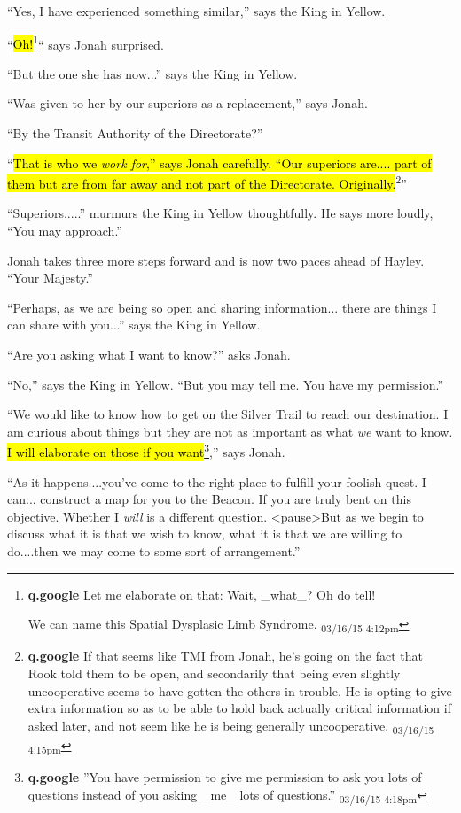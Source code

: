 ``Yes, I have experienced something similar,'' says the King in Yellow.

``\hl{Oh!}\footnote{\textbf{q.google }Let me elaborate on that: Wait, \_what\_?  Oh do tell!

We can name this Spatial Dysplasic Limb Syndrome. \textsubscript{03/16/15 4:12pm}}`` says Jonah surprised.

``But the one she has now...'' says the King in Yellow.

``Was given to her by our superiors as a replacement,'' says Jonah.

``By the Transit Authority of the Directorate?'' 

``\hl{That is who we \textit{work for},'' says Jonah carefully.  ``Our superiors are.... part of them but are from far away and not part of the Directorate.  Originally.}\footnote{\textbf{q.google }If that seems like TMI from Jonah, he's going on the fact that Rook told them to be open, and secondarily that being even slightly uncooperative seems to have gotten the others in trouble.  He is opting to give extra information so as to be able to hold back actually critical information if asked later, and not seem like he is being generally uncooperative. \textsubscript{03/16/15 4:15pm}}''

``Superiors.....'' murmurs the King in Yellow thoughtfully.  He says more loudly, ``You may approach.'' 

Jonah takes three more steps forward and is now two paces ahead of Hayley.  ``Your Majesty.''

``Perhaps, as we are being so open and sharing information... there are things I can share with you...'' says the King in Yellow.

``Are you asking what I want to know?'' asks Jonah.

``No,'' says the King in Yellow.  ``But you may tell me.  You have my permission.''

``We would like to know how to get on the Silver Trail to reach our destination.  I am curious about things but they are not as important as what \textit{we} want to know.   \hl{I will elaborate on those if you want}\footnote{\textbf{q.google }''You have permission to give me permission to ask you lots of questions instead of you asking \_me\_ lots of questions.'' \textsubscript{03/16/15 4:18pm}},'' says Jonah.

``As it happens....you've come to the right place to fulfill your foolish quest.  I can... construct a map for you to the Beacon.  If you are truly bent on this objective.  Whether I \textit{will} is a different question. \textless pause\textgreater   But as we begin to discuss what it is that we wish to know, what it is that we are willing to do....then we may come to some sort of arrangement.''

